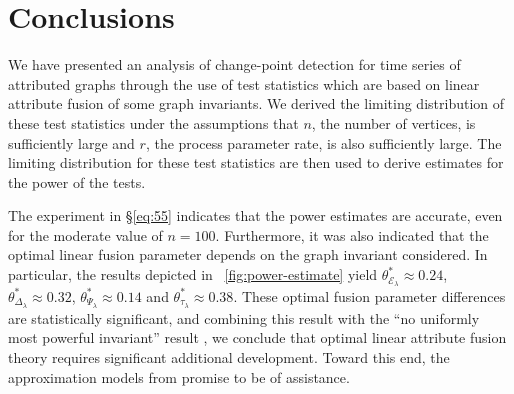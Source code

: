 \documentclass[10pt,journal,compsoc]{IEEEtran}
\theoremstyle{definition}
\begin{document}
\section{Conclusions}
We have presented an analysis of change-point detection for time
series of attributed graphs through the use of test statistics which
are based on linear attribute fusion of some graph invariants. 
We derived the limiting distribution of these test statistics under
the assumptions that $n$, the number of vertices, is sufficiently
large and $r$, the process parameter rate, is also sufficiently
large. The limiting distribution for these test statistics are then
used to derive estimates for the power of the tests. 

The experiment in \S \ref{eq:55} indicates that the power estimates
are accurate, even for the moderate value of $n = 100$. Furthermore,
it was also indicated that the optimal linear fusion parameter depends
on the graph invariant considered. In particular, the results depicted
in \figurename~\ref{fig:power-estimate} yield
$\theta^{*}_{\mathcal{E}_{\lambda}} \approx 0.24$,
$\theta^{*}_{\Delta_{\lambda}} \approx 0.32$,
$\theta^{*}_{\Psi_{\lambda}} \approx 0.14$ and
$\theta^{*}_{\tau_{\lambda}} \approx 0.38$. These optimal fusion
parameter differences are statistically significant, and combining
this result with the ``no uniformly most powerful invariant'' result
\cite{pao11:_statis_infer_random_graph}, we conclude that optimal
linear attribute fusion theory requires significant additional
development. Toward this end, the approximation models from
\cite{lee11} promise to be of assistance.
\end{document}
